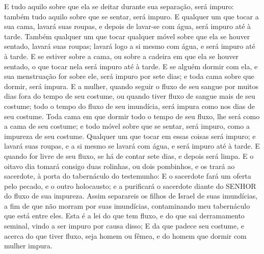 {{  E tudo aquilo sobre que ela se deitar durante sua separação, será impuro: também tudo aquilo sobre que se sentar, será impuro.
  E qualquer um que tocar a sua cama, lavará suas roupas, e depois de lavar-se com água, será impuro até à tarde.
  Também qualquer um que tocar qualquer móvel sobre que ela se houver sentado, lavará suas roupas; lavará logo a si mesmo com água, e será impuro até à tarde.
  E se estiver sobre a cama, ou sobre a cadeira em que ela se houver sentado, o que tocar nela será impuro até à tarde.
  E se alguém dormir com ela, e sua menstruação for sobre ele, será impuro por sete dias; e toda cama sobre que dormir, será impura.
  E a mulher, quando seguir o fluxo de seu sangue por muitos dias fora do tempo de seu costume, ou quando tiver fluxo de sangue mais de seu costume; todo o tempo do fluxo de seu imundícia, será impura como nos dias de seu costume.
  Toda cama em que dormir todo o tempo de seu fluxo, lhe será como a cama de seu costume; e todo móvel sobre que se sentar, será impuro, como a impureza de seu costume.
  Qualquer um que tocar em essas coisas será impuro; e lavará suas roupas, e a si mesmo se lavará com água, e será impuro até à tarde.
  E quando for livre de seu fluxo, se há de contar sete dias, e depois será limpa.
  E o oitavo dia tomará consigo duas rolinhas, ou dois pombinhos, e os trará ao sacerdote, à porta do tabernáculo do testemunho:
  E o sacerdote fará um oferta pelo pecado, e o outro holocausto; e a purificará o sacerdote diante do SENHOR do fluxo de sua impureza.
  Assim separareis os filhos de Israel de suas imundícias, a fim de que não morram por suas imundícias, contaminando meu tabernáculo que está entre eles.
  Esta é a lei do que tem fluxo, e do que sai derramamento seminal, vindo a ser impuro por causa disso;
  E da que padece seu costume, e acerca do que tiver fluxo, seja homem ou fêmea, e do homem que dormir com mulher impura}.
\par }

